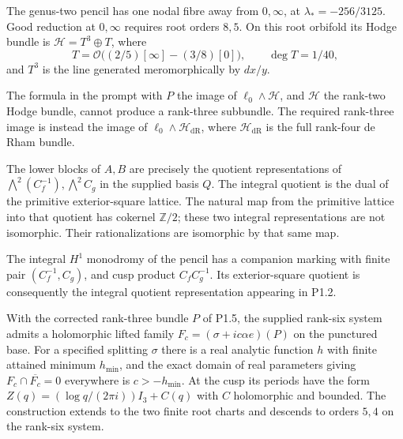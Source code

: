 \begin{theorem}\label{night:P1.4}
The genus-two pencil has one nodal fibre away from $0,\infty$, at
$\lambda_*=-256/3125$.  Good reduction at $0,\infty$ requires root
orders $8,5$.  On this root orbifold its Hodge bundle is
$\mathcal H=T^3\oplus T$, where
\[
T=\mathcal O\bigl((2/5)[\infty]-(3/8)[0]\bigr),\qquad
\deg T=1/40,
\]
and $T^3$ is the line generated meromorphically by $dx/y$.
\end{theorem}

\begin{theorem}\label{night:P1.5}
The formula in the prompt with $P$ the image of
$\ell_0\wedge\mathcal H$, and $\mathcal H$ the rank-two Hodge bundle,
cannot produce a rank-three subbundle.  The required rank-three image
is instead the image of $\ell_0\wedge\mathcal H_{\mathrm{dR}}$, where
$\mathcal H_{\mathrm{dR}}$ is the full rank-four de Rham bundle.
\end{theorem}

\begin{theorem}\label{night:P1.2}
The lower blocks of $A,B$ are precisely the quotient representations of
$\bigwedge^2(C_f^{-1}),\bigwedge^2C_g$ in the supplied basis $Q$.
The integral quotient is the dual of the primitive exterior-square
lattice.  The natural map from the primitive lattice into that quotient
has cokernel $\mathbb Z/2$; these two integral representations are not
isomorphic.  Their rationalizations are isomorphic by that same map.
\end{theorem}

\begin{theorem}\label{night:P1.7}
The integral $H^1$ monodromy of the pencil has a companion marking with
finite pair $(C_f^{-1},C_g)$, and cusp product $C_fC_g^{-1}$.
Its exterior-square quotient is consequently the integral quotient
representation appearing in P1.2.
\end{theorem}

\begin{theorem}\label{night:P1.8}
With the corrected rank-three bundle $P$ of P1.5, the supplied rank-six
system admits a holomorphic lifted family
$F_c=(\sigma+ic\alpha e)(P)$ on the punctured base.
For a specified splitting $\sigma$ there is a real analytic function
$h$ with finite attained minimum $h_{\min}$, and the exact domain of
real parameters giving $F_c\cap\overline{F_c}=0$ everywhere is
$c>-h_{\min}$.
At the cusp its periods have the form
$Z(q)=(\log q/(2\pi i))I_3+C(q)$ with $C$ holomorphic and bounded.
The construction extends to the two finite root charts and descends to
orders $5,4$ on the rank-six system.
\end{theorem}

